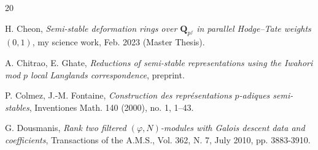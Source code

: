 \documentclass[11pt]{amsart}
\theoremstyle{definition}
\numberwithin{equation}{subsection}
\theoremstyle{plain}
\theoremstyle{plain}
\theoremstyle{plain}
\theoremstyle{plain}
\theoremstyle{plain}
\theoremstyle{plain}
\theoremstyle{plain}
\theoremstyle{plain}
\theoremstyle{plain}
\theoremstyle{plain}
\theoremstyle{plain}
\theoremstyle{plain}
\theoremstyle{definition}
\theoremstyle{definition}
\theoremstyle{definition}
\theoremstyle{remark}
\renewcommand{\(}{\textup{(}}
\renewcommand{\)}{\textup{)}}
\newcommand{\Q}{\mathbf{Q}}
\newcommand{\F}{\mathbf{F}}
\newcommand{\GL}{\mathrm{GL}}
\begin{document}
\begin{thebibliography}{20}



 H. Cheon, \emph{Semi-stable deformation rings over $\Q_{p^f}$ in parallel Hodge--Tate weights $(0,1)$}, my science work, Feb. 2023 (Master Thesis).


 A. Chitrao, E. Ghate, \emph{Reductions of semi-stable representations using the Iwahori mod $p$ local Langlands correspondence}, preprint.




 P. Colmez, J.-M. Fontaine, \emph{Construction des repr\'esentations $p$-adiques semi-stables}, Inventiones Math. 140 (2000), no. 1, 1--43.







 G. Dousmanis, \emph{Rank two filtered $(\varphi,N)$-modules with Galois descent data and coefficients}, Transactions of the A.M.S., Vol. 362, N. 7, July 2010, pp. 3883-3910.




\end{thebibliography}
\end{document}
